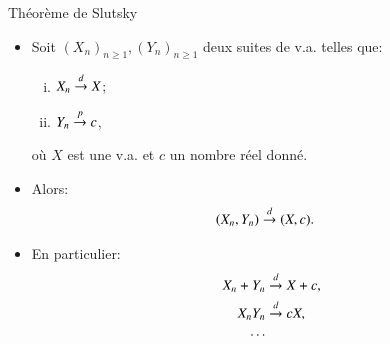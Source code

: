\begin{frame}
    [allowframebreaks]{Théorème de Slutsky}
    \begin{itemize}
        \item Soit $(X_n)_{n\geq 1}, (Y_n)_{n\geq 1}$ deux suites de v.a. telles que: 
        \begin{enumerate}[(i)]
            \item $X_n \overset{d}{\rightarrow} X$;
            \item $Y_n \overset{p}{\rightarrow} c$, 
        \end{enumerate}
        où $X$ est une v.a. et $c$ un nombre réel donné. 
        \item Alors: \begin{align*}
            (X_n, Y_n) &\overset{d}{\rightarrow} (X, c).
        \end{align*}
        \item En particulier: \begin{align*}
            X_n + Y_n &\overset{d}{\rightarrow} X + c,\\
            X_nY_n&\overset{d}{\rightarrow} cX,\\
            \cdots
        \end{align*}
    \end{itemize}
\end{frame}
